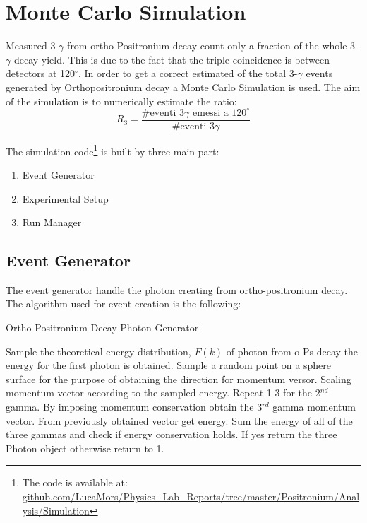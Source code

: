 \makeatletter
\def\BState{\State\hskip-\ALG@thistlm}
\makeatother

\section*{Monte Carlo Simulation}

Measured 3-$\gamma$ from ortho-Positronium decay count only a fraction of the whole 3-$\gamma$ decay yield. This is due to the fact that the triple coincidence is between detectors at 120$^\circ$. In order to get a correct estimated of the total 3-$\gamma$ events generated by Orthopositronium decay a Monte Carlo Simulation is used. The aim of the simulation is to numerically estimate the ratio:
\begin{equation*}
R_3 = \dfrac{\#\text{eventi 3}\gamma\text{ emessi a 120}^\circ}{\#\text{eventi 3}\gamma}
\end{equation*}

The simulation code\footnote{\noindent The code is available at:\\ \href{https://github.com/LucaMors/Physics_Lab_Reports/tree/master/Positronium/Analysis/Simulation}{github.com/LucaMors/Physics\_Lab\_Reports/tree/master/Positronium/Analysis/Simulation}} is built by three main part:
\begin{enumerate}
\item Event Generator
\item Experimental Setup
\item Run Manager
\end{enumerate}

\subsection*{Event Generator}

The event generator handle the photon creating from ortho-positronium decay. The algorithm used for event creation is the following:
\begin{algorithm}
\caption{Ortho-Positronium Decay Photon Generator}\label{euclid}
\begin{algorithmic}[1]
\State Sample the theoretical energy distribution, $F(k)$ of photon from o-Ps decay the energy for the first photon is obtained.
\State Sample a random point on a sphere surface for the purpose of obtaining the direction for momentum versor.
\State Scaling momentum vector according to the sampled energy.
\State Repeat 1-3 for the 2$^{nd}$ gamma.
\State By imposing momentum conservation obtain the 3$^{rd}$ gamma momentum vector.
\State From previously obtained vector get energy.
\State Sum the energy of all of the three gammas and check if energy conservation holds. If yes return the three Photon object otherwise return to 1.
\end{algorithmic}
\end{algorithm}

